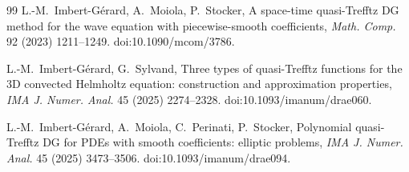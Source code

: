 \documentclass[preprint,12pt]{elsarticle}
\begin{document}
\begin{thebibliography}{99}
L.-M.~Imbert-G\'erard, A.~Moiola, P.~Stocker,
A space-time quasi-Trefftz DG method for the wave equation with piecewise-smooth coefficients,
\emph{Math. Comp.} 92 (2023) 1211--1249.
\newblock doi:10.1090/mcom/3786.

L.-M.~Imbert-G\'erard, G.~Sylvand,
Three types of quasi-Trefftz functions for the 3D convected Helmholtz equation: construction and approximation properties,
\emph{IMA J. Numer. Anal.} 45 (2025) 2274--2328.
\newblock doi:10.1093/imanum/drae060.

L.-M.~Imbert-G\'erard, A.~Moiola, C.~Perinati, P.~Stocker,
Polynomial quasi-Trefftz DG for PDEs with smooth coefficients: elliptic problems,
\emph{IMA J. Numer. Anal.} 45 (2025) 3473--3506.
\newblock doi:10.1093/imanum/drae094.
\end{thebibliography}
\end{document}

